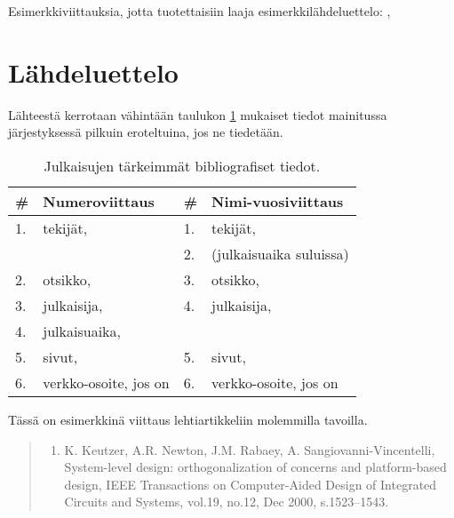 \documentclass[globalnumbering,centeredcaptions]{tutthesis/tutthesis} %
\begin{document}
Esimerkkiviittauksia, jotta tuotettaisiin laaja esimerkkilähdeluettelo: \citep{Weber2001} \citep{Cattaneo2004} \citep{Kaunisto2003} \citep{Li2004} \citep{Ho-Ching2003} \citep{Puhakka2004} \citep{Nissinen2011} \citep{Ohlstrom2005} \citep{OMAP4430} \citep{InjectionMolding2005} \citep{Raakakk2002} \citep{Intel2013} \citep{Davies2004} \citep{SFSISO1000A1} \citep{Keskinen2005} \citep{Sahkoturvallisuuslaki1996} \citep{Pan2013} \citep{Tty2005} \citep{ConstInorgComp2005}, \citep{Radionuklidit2003} \citep{Kalkkihiekkatiilet2004} \citep{Miettinen2005}


\section{Lähdeluettelo}

Lähteestä kerrotaan vähintään taulukon \ref{tab:bibliografiset-tiedot} mukaiset tiedot mainitussa järjestyksessä pilkuin eroteltuina, jos ne tiedetään.

\begin{table}[ht!]
\caption{Julkaisujen tärkeimmät bibliografiset tiedot.}
\label{tab:bibliografiset-tiedot}
\begin{tabular}{l l | l l}
\hline
\textbf{\#} & \textbf{Numeroviittaus} & \# & \textbf{Nimi-vuosiviittaus} \\
\hline \hline
1. & tekijät, & 1. & tekijät,\\
& & 2. & (julkaisuaika suluissa) \\
2. & otsikko, & 3. & otsikko, \\
3. & julkaisija, & 4. & julkaisija, \\
4. & julkaisuaika, & \\
5. & sivut, & 5. & sivut, \\
6. & verkko-osoite, jos on & 6. & verkko-osoite, jos on \\
\hline
\end{tabular}
\end{table}

Tässä on esimerkkinä viittaus lehtiartikkeliin molemmilla tavoilla.

\begin{quotation}
\small
\begin{enumerate}
  \renewcommand*\labelenumi{[\theenumi]}
  \setcounter{enumi}{99}
  \item K. Keutzer, A.R. Newton, J.M. Rabaey, A. Sangiovanni-Vincentelli, System-level design: orthogonalization of concerns and platform-based design, IEEE Transactions on Computer-Aided Design of Integrated Circuits and Systems, vol.19, no.12, Dec 2000, s.1523--1543.
\end{enumerate}
\end{quotation}
\end{document}
